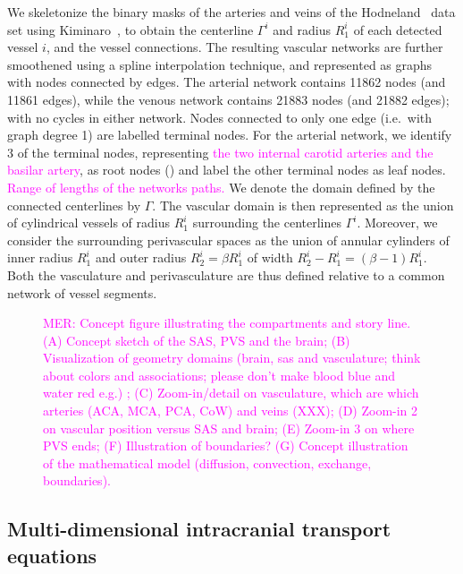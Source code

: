 \documentclass[fleqn,10pt]{wlscirep}
\newcommand{\mer}[1]{\textcolor{magenta}{#1}}
\begin{document}
We skeletonize the binary masks of the arteries and veins of the
Hodneland~\cite{hodneland2019new} data set using
Kiminaro~\cite{william_silversmith_2021_5539913}, to obtain the
centerline $\Gamma^i$ and radius $R_1^i$ of each detected vessel $i$,
and the vessel connections. The resulting vascular networks are
further smoothened using a spline interpolation technique, and
represented as graphs with nodes connected by edges. The arterial
network contains 11862 nodes (and 11861 edges), while the venous
network contains 21883 nodes (and 21882 edges); with no cycles in
either network. Nodes connected to only one edge (i.e.~with graph
degree 1) are labelled terminal nodes. For the arterial network, we
identify 3 of the terminal nodes, representing \mer{the two internal
  carotid arteries and the basilar artery}, as root nodes
() and label the other terminal nodes as leaf
nodes. \mer{Range of lengths of the networks paths.} We denote the
domain defined by the connected centerlines by $\Gamma$. The vascular
domain is then represented as the union of cylindrical vessels of
radius $R_1^i$ surrounding the centerlines $\Gamma^i$. Moreover, we
consider the surrounding perivascular spaces as the union of annular
cylinders of inner radius $R_1^i$ and outer radius $R_2^i = \beta R_1^i$ of width $R_2^i - R_1^i = (\beta - 1) R_1^i$. Both the
vasculature and perivasculature are thus defined relative to a common
network of vessel segments.

\begin{figure}
  \caption{\mer{MER: Concept figure illustrating the compartments and story line. (A) Concept sketch of the SAS, PVS and the brain; (B) Visualization of geometry domains (brain, sas and vasculature; think about colors and associations; please don't make blood blue and water red e.g.) ; (C) Zoom-in/detail on vasculature, which are which arteries (ACA, MCA, PCA, CoW)  and veins (XXX); (D) Zoom-in 2 on vascular position versus SAS and brain; (E) Zoom-in 3 on where PVS ends; (F) Illustration of boundaries? (G) Concept illustration of the mathematical model (diffusion, convection, exchange, boundaries).}}
\label{fig:concept}
\end{figure}

\subsection*{Multi-dimensional intracranial transport equations}
\end{document}
